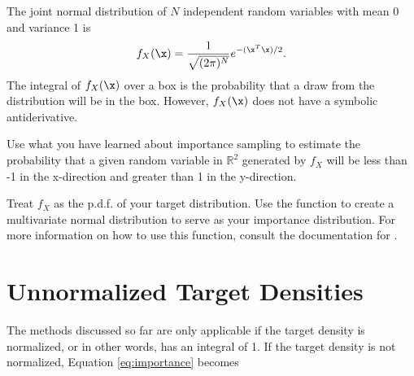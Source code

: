 \begin{problem}
The joint normal distribution of $N$ independent random variables with mean 0 and variance 1 is
\[
f_X(\x) = \frac{1}{\sqrt{(2 \pi)^N}} e^{-(\x^T\x)/2}.
\]
The integral of $f_X(\x)$ over a box is the probability that a draw from the distribution will be in the box.
However, $f_X(\x)$ does not have a symbolic antiderivative.

Use what you have learned about importance sampling to estimate the probability that a given random variable in $\mathbb{R}^2$ generated by $f_X$ will be less than -1 in the x-direction and greater than 1 in the y-direction.

Treat $f_X$ as the p.d.f. of your target distribution.
Use the function  to create a multivariate normal distribution to serve as your importance distribution.
For more information on how to use this function, consult the documentation for
.
\end{problem}

\section*{Unnormalized Target Densities} %

The methods discussed so far are only applicable if the target density is normalized, or in other words, has an integral of 1. If the target density is not normalized, Equation \ref{eq:importance} becomes

